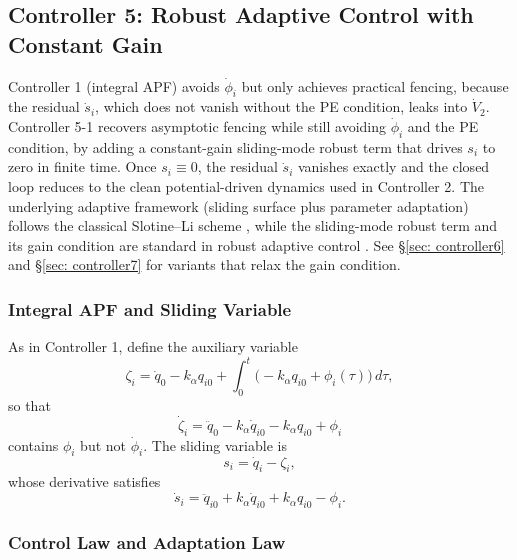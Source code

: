 \subsection{Controller 5: Robust Adaptive Control with Constant Gain}
\label{sec: controller5}

Controller 1 (integral APF) avoids $\dot{\phi}_i$ but only achieves practical fencing,
because the residual $\dot{s}_i$, which does not vanish without the PE condition, leaks into
$\dot{V}_2$. Controller 5-1 recovers asymptotic fencing while still avoiding $\dot{\phi}_i$ and
the PE condition, by adding a constant-gain sliding-mode robust term that drives $s_i$ to
zero in finite time. Once $s_i \equiv 0$, the residual $\dot{s}_i$ vanishes exactly and the
closed loop reduces to the clean potential-driven dynamics used in Controller 2. The
underlying adaptive framework (sliding surface plus parameter adaptation) follows the
classical Slotine--Li scheme \cite{slotineAdaptiveControlRobot1987}, while the sliding-mode
robust term and its gain condition are standard in robust adaptive control
\cite{slotineLiAppliedNonlinearControl1991,ioannouSunRobustAdaptiveControl1996}. See
\S\ref{sec: controller6} and \S\ref{sec: controller7} for variants that relax the
gain condition.

\subsubsection{Integral APF and Sliding Variable}

As in Controller 1, define the auxiliary variable
\begin{equation}\label{eq5:zeta}
	\zeta_i = \dot{q}_0 - k_\alpha q_{i0}
	+ \int_0^t \bigl(-k_\alpha q_{i0} + \phi_i(\tau)\bigr)\,d\tau,
\end{equation}
so that
\begin{equation}\label{eq5:zeta_dot}
	\dot{\zeta}_i = \ddot{q}_0 - k_\alpha \dot{q}_{i0} - k_\alpha q_{i0} + \phi_i
\end{equation}
contains $\phi_i$ but not $\dot{\phi}_i$. The sliding variable is
\begin{equation}\label{eq5:sliding_var}
	s_i = \dot{q}_i - \zeta_i,
\end{equation}
whose derivative satisfies
\begin{equation}\label{eq5:s_dot_def}
	\dot{s}_i = \ddot{q}_{i0} + k_\alpha \dot{q}_{i0} + k_\alpha q_{i0} - \phi_i.
\end{equation}

\subsubsection{Control Law and Adaptation Law}

